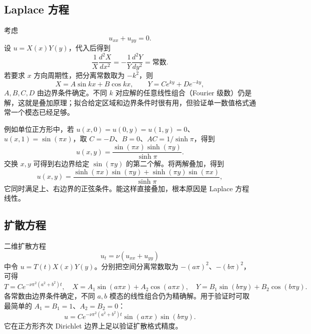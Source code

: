 \documentclass[11pt,a4paper,openany,fontset=none]{ctexbook}
\begin{document}
\subsection{Laplace 方程}

考虑
\begin{equation}
 u_{xx}+u_{yy}=0. \tag{6.1.1}
\end{equation}
设 $u=X(x)Y(y)$，代入后得到
\begin{equation}
 \frac1X\frac{d^2X}{dx^2}=-\frac1Y\frac{d^2Y}{dy^2}=\text{常数}. \tag{6.1.4}
\end{equation}
若要求 $x$ 方向周期性，把分离常数取为 $-k^2$，则
\begin{equation}
 X=A\sin kx+B\cos kx,\qquad Y=Ce^{ky}+De^{-ky}, \tag{6.1.5--6.1.6}
\end{equation}
$A,B,C,D$ 由边界条件确定。不同 $k$ 对应解的任意线性组合（Fourier 级数）仍是解，这就是叠加原理；拟合给定区域和边界条件时很有用，但验证单一数值格式通常一个模态已经足够。

例如单位正方形中，若 $u(x,0)=u(0,y)=u(1,y)=0$、$u(x,1)=\sin(\pi x)$，取 $C=-D$、$B=0$、$AC=1/\sinh\pi$，得到
\begin{equation}
 u(x,y)=\frac{\sin(\pi x)\sinh(\pi y)}{\sinh\pi}. \tag{6.1.12}
\end{equation}
交换 $x,y$ 可得到右边界给定 $\sin(\pi y)$ 的第二个解。将两解叠加，得到
\begin{equation}
 u(x,y)=\frac{\sinh(\pi x)\sin(\pi y)+\sinh(\pi y)\sin(\pi x)}{\sinh\pi}, \tag{6.1.16}
\end{equation}
它同时满足上、右边界的正弦条件。能这样直接叠加，根本原因是 Laplace 方程线性。

\subsection{扩散方程}

二维扩散方程
\begin{equation}
 u_t=\nu(u_{xx}+u_{yy}) \tag{6.1.20}
\end{equation}
中令 $u=T(t)X(x)Y(y)$。分别把空间分离常数取为 $-(a\pi)^2$、$-(b\pi)^2$，可得
\begin{equation}
 T=Ce^{-\nu\pi^2(a^2+b^2)t},\quad
 X=A_1\sin(a\pi x)+A_2\cos(a\pi x),\quad
 Y=B_1\sin(b\pi y)+B_2\cos(b\pi y). \tag{6.1.24--6.1.26}
\end{equation}
各常数由边界条件确定，不同 $a,b$ 模态的线性组合仍为精确解。用于验证时可取最简单的 $A_1=B_1=1$、$A_2=B_2=0$：
\begin{equation}
 u=Ce^{-\nu\pi^2(a^2+b^2)t}\sin(a\pi x)\sin(b\pi y). \tag{6.1.28}
\end{equation}
它在正方形齐次 Dirichlet 边界上足以验证扩散格式精度。
\end{document}
